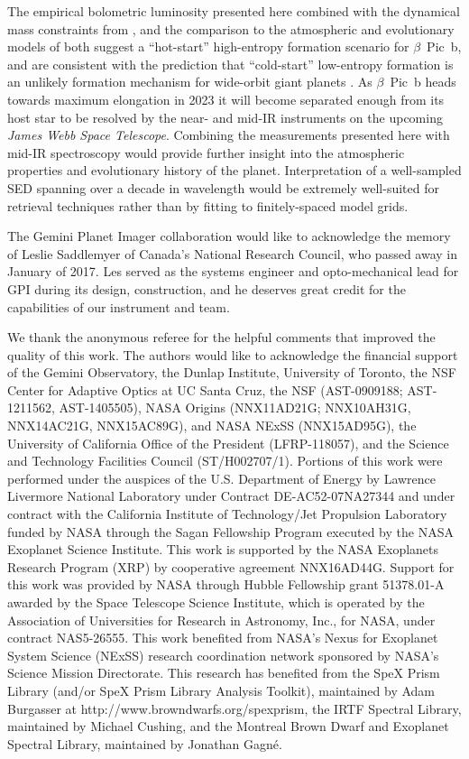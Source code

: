 \documentclass[twocolumn]{aastex6}
\begin{document}
The empirical bolometric luminosity presented here combined with the dynamical mass constraints from \citet{Lagrange2012}, and the comparison to the atmospheric and evolutionary models of \citet{SpiegelBurrows2012} both suggest a ``hot-start'' high-entropy formation scenario for $\beta$~Pic~b, and are consistent with the prediction that ``cold-start'' low-entropy formation is an unlikely formation mechanism for wide-orbit giant planets \citep[e.g.,][]{Marleau2017}. As $\beta$~Pic~b heads towards maximum elongation in 2023 it will become separated enough from its host star to be resolved by the near- and mid-IR instruments on the upcoming {\it James Webb Space Telescope}. Combining the measurements presented here with mid-IR spectroscopy would provide further insight into the atmospheric properties and evolutionary history of the planet. Interpretation of a well-sampled SED spanning over a decade in wavelength would be extremely well-suited for retrieval techniques \citep[e.g.,][]{Burningham2017} rather than by fitting to finitely-spaced model grids.

\acknowledgments

The Gemini Planet Imager collaboration would like to acknowledge the memory of Leslie Saddlemyer of Canada’s National Research Council, who passed away in January of 2017. Les served as the systems engineer and opto-mechanical lead for GPI during its design, construction, and he deserves great credit for the capabilities of our instrument and team.

We thank the anonymous referee for the helpful comments that improved the quality of this work. The authors would like to acknowledge the financial support of the Gemini Observatory, the Dunlap Institute, University of Toronto, the NSF Center for Adaptive Optics at UC Santa Cruz, the NSF (AST-0909188; AST-1211562, AST-1405505), NASA Origins (NNX11AD21G; NNX10AH31G, NNX14AC21G, NNX15AC89G), and NASA NExSS (NNX15AD95G), the University of California Office of the President (LFRP-118057), and the Science and Technology Facilities Council (ST/H002707/1). Portions of this work were performed under the auspices of the U.S. Department of Energy by Lawrence Livermore National Laboratory under Contract DE-AC52-07NA27344 and under contract with the California Institute of Technology/Jet Propulsion Laboratory funded by NASA through the Sagan Fellowship Program executed by the NASA Exoplanet Science Institute. This work is supported by the NASA Exoplanets Research Program (XRP) by cooperative agreement NNX16AD44G. Support for this work was provided by NASA through Hubble Fellowship grant 51378.01-A awarded by the Space Telescope Science Institute, which is operated by the Association of Universities for Research in Astronomy, Inc., for NASA, under contract NAS5-26555. This work benefited from NASA’s Nexus for Exoplanet System Science (NExSS) research coordination network sponsored by NASA’s Science Mission Directorate. This research has benefited from the SpeX Prism Library (and/or SpeX Prism Library Analysis Toolkit), maintained by Adam Burgasser at http://www.browndwarfs.org/spexprism, the IRTF Spectral Library, maintained by Michael Cushing, and the Montreal Brown Dwarf and Exoplanet Spectral Library, maintained by Jonathan Gagn{\'e}.
\end{document}

